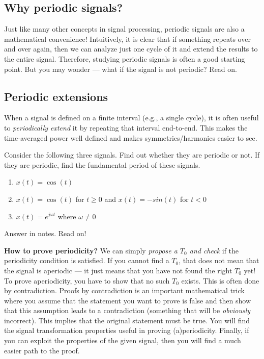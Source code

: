 \subsection{Why periodic signals?} Just like many other concepts in signal processing, periodic signals are also a mathematical convenience! Intuitively, it is clear that if something repeats over and over again, then we can analyze just one cycle of it and extend the results to the entire signal. Therefore, studying periodic signals is often a good starting point. But you may wonder --- what if the signal is not periodic? Read on.

\subsection{Periodic extensions} 
When a signal is defined on a finite interval (e.g., a single cycle), it is often useful to \emph{periodically extend} it by repeating that interval end-to-end. This makes the time-averaged power well defined and makes symmetries/harmonics easier to see. 

\begin{popquiz}
Consider the following three signals. Find out whether they are periodic or not. If they are periodic, find the fundamental period of these signals.
\begin{enumerate}
    \item $x(t) = \cos(t)$
    \item $x(t) = \cos(t)$ for $ t \geq 0$ and $x(t) = -sin(t) $ for $t < 0$
    \item $x(t) = e^{j\omega t}$ where $\omega \neq 0$
\end{enumerate}
\popqsplit
Answer in notes. Read on!
\end{popquiz}

\textbf{How to prove periodicity?} We can simply \emph{propose a $T_0$ and check} if the periodicity condition is satisfied. If you cannot find a $T_0$, that does not mean that the signal is aperiodic --- it just means that you have not found the right $T_0$ yet! To prove aperiodicity, you have to show that no such $T_0$ exists. This is often done by contradiction. Proofs by contradiction is an important mathematical trick where you assume that the statement you want to prove is false and then show that this assumption leads to a contradiction (something that will be \emph{obviously} incorrect). This implies that the original statement must be true. You will find the signal transformation properties useful in proving (a)periodicity. Finally, if you can exploit the properties of the given signal, then you will find a much easier path to the proof.

